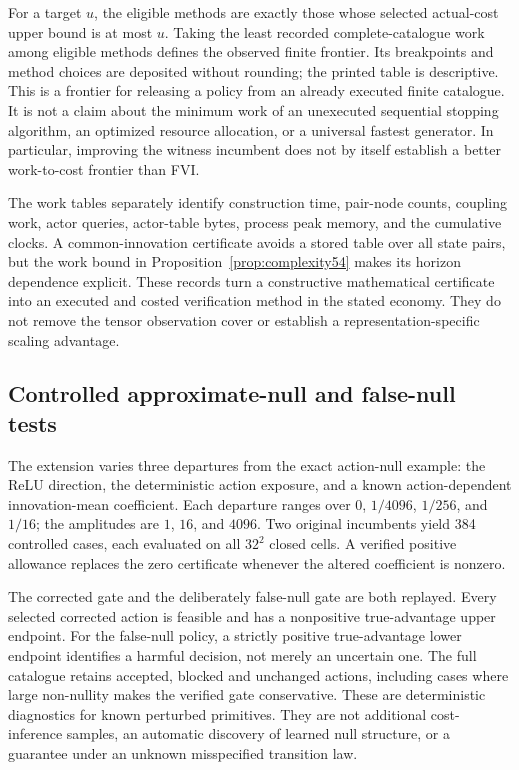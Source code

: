 

For a target $u$, the eligible methods are exactly those whose selected actual-cost upper bound is at most $u$. Taking the least recorded complete-catalogue work among eligible methods defines the observed finite frontier. Its breakpoints and method choices are deposited without rounding; the printed table is descriptive. This is a frontier for releasing a policy from an already executed finite catalogue. It is not a claim about the minimum work of an unexecuted sequential stopping algorithm, an optimized resource allocation, or a universal fastest generator. In particular, improving the witness incumbent does not by itself establish a better work-to-cost frontier than FVI.

The work tables separately identify construction time, pair-node counts, coupling work, actor queries, actor-table bytes, process peak memory, and the cumulative clocks. A common-innovation certificate avoids a stored table over all state pairs, but the work bound in Proposition~\ref{prop:complexity54} makes its horizon dependence explicit. These records turn a constructive mathematical certificate into an executed and costed verification method in the stated economy. They do not remove the tensor observation cover or establish a representation-specific scaling advantage.

\subsection{Controlled approximate-null and false-null tests}
The extension varies three departures from the exact action-null example: the ReLU direction, the deterministic action exposure, and a known action-dependent innovation-mean coefficient. Each departure ranges over $0$, $1/4096$, $1/256$, and $1/16$; the amplitudes are $1$, $16$, and $4096$. Two original incumbents yield 384 controlled cases, each evaluated on all $32^2$ closed cells. A verified positive allowance replaces the zero certificate whenever the altered coefficient is nonzero.



The corrected gate and the deliberately false-null gate are both replayed. Every selected corrected action is feasible and has a nonpositive true-advantage upper endpoint. For the false-null policy, a strictly positive true-advantage lower endpoint identifies a harmful decision, not merely an uncertain one. The full catalogue retains accepted, blocked and unchanged actions, including cases where large non-nullity makes the verified gate conservative. These are deterministic diagnostics for known perturbed primitives. They are not additional cost-inference samples, an automatic discovery of learned null structure, or a guarantee under an unknown misspecified transition law.
